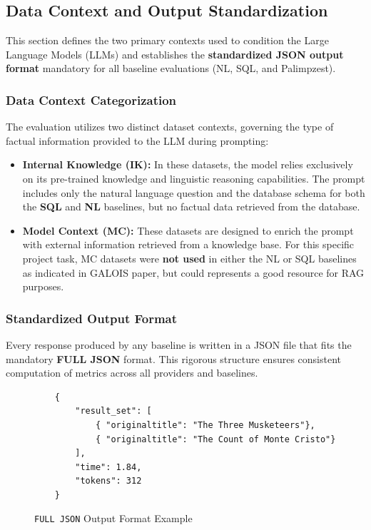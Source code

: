 \vspace{2em}
\subsection{Data Context and Output Standardization}

This section defines the two primary contexts used to condition the Large Language Models (LLMs) and establishes the \textbf{standardized JSON output format} mandatory for all baseline evaluations (NL, SQL, and Palimpzest).

\medskip

\subsubsection{Data Context Categorization}

The evaluation utilizes two distinct dataset contexts, governing the type of factual information provided to the LLM during prompting:

\begin{itemize} [leftmargin=*]
    \item \textbf{Internal Knowledge (IK):} In these datasets, the model relies exclusively on its pre-trained knowledge and linguistic reasoning capabilities. The prompt includes only the natural language question and the database schema for both the \textbf{SQL} and \textbf{NL} baselines, but no factual data retrieved from the database.
    \item \textbf{Model Context (MC):} These datasets are designed to enrich the prompt with external information retrieved from a knowledge base. For this specific project task, MC datasets were \textbf{not used} in either the NL or SQL baselines as indicated in GALOIS paper, but could represents a good resource for RAG purposes.
\end{itemize}

\medskip

\subsubsection{Standardized Output Format}

Every response produced by any baseline is written in a JSON file that fits the mandatory \textbf{FULL JSON} format. This rigorous structure ensures consistent computation of metrics across all providers and baselines.

\begin{figure}[h!]
    \centering
    \begin{verbatim}
    {
        "result_set": [
            { "originaltitle": "The Three Musketeers"},
            { "originaltitle": "The Count of Monte Cristo"}
        ],
        "time": 1.84,
        "tokens": 312
    }
    \end{verbatim}
    \caption{\texttt{FULL JSON} Output Format Example}
\end{figure}

